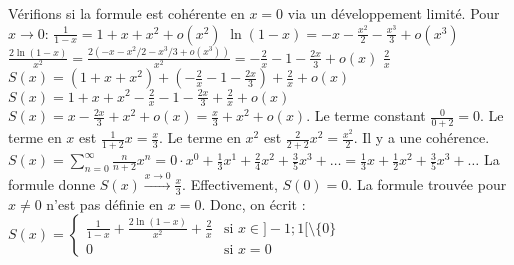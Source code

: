 {\begin{enumerate}
{			Vérifions si la formule est cohérente en $x=0$ via un développement limité.
			Pour $x \to 0$:
			$\frac{1}{1-x} = 1+x+x^2+o(x^2)$
			$\ln(1-x) = -x - \frac{x^2}{2} - \frac{x^3}{3} + o(x^3)$
			$\frac{2\ln(1-x)}{x^2} = \frac{2(-x - x^2/2 - x^3/3 + o(x^3))}{x^2} = -\frac{2}{x} - 1 - \frac{2x}{3} + o(x)$
			$\frac{2}{x}$
			$S(x) = (1+x+x^2) + (-\frac{2}{x} - 1 - \frac{2x}{3}) + \frac{2}{x} + o(x)$
			$S(x) = 1+x+x^2 - \frac{2}{x} - 1 - \frac{2x}{3} + \frac{2}{x} + o(x)$
			$S(x) = x - \frac{2x}{3} + x^2 + o(x) = \frac{x}{3} + x^2 + o(x)$.
			Le terme constant $\frac{0}{0+2} = 0$. Le terme en $x$ est $\frac{1}{1+2}x = \frac{x}{3}$. Le terme en $x^2$ est $\frac{2}{2+2}x^2 = \frac{x^2}{2}$.
			Il y a une cohérence.
			$S(x) = \sum_{n=0}^{\infty} \frac{n}{n+2}x^n = 0 \cdot x^0 + \frac{1}{3}x^1 + \frac{2}{4}x^2 + \frac{3}{5}x^3 + \dots = \frac{1}{3}x + \frac{1}{2}x^2 + \frac{3}{5}x^3 + \dots$
			La formule donne $S(x) \xrightarrow{x \to 0} \frac{x}{3}$.
			Effectivement, $S(0) = 0$. La formule trouvée pour $x \neq 0$ n'est pas définie en $x=0$.
			Donc, on écrit :
			$S(x) = \begin{cases} \frac{1}{1-x} + \frac{2\ln(1-x)}{x^2} + \frac{2}{x} & \text{si } x \in ]-1;1[ \setminus \{0\} \\ 0 & \text{si } x=0 \end{cases}$
		}
	\end{enumerate}
}